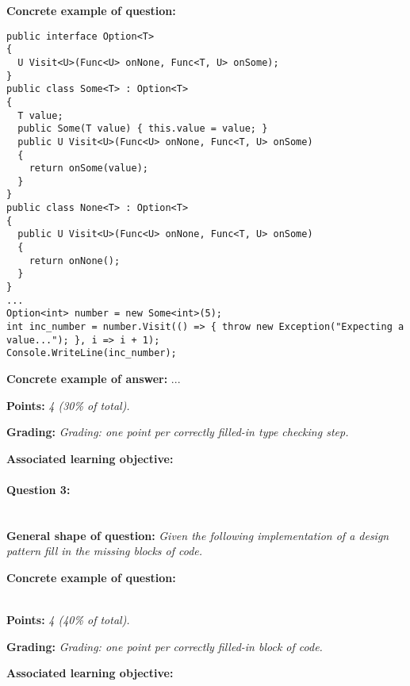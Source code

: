 \textbf{Concrete example of question:} 

\lstset{numbers=left,basicstyle=\ttfamily\small}\lstset{language=[Sharp]C}
\begin{lstlisting}
public interface Option<T>
{
  U Visit<U>(Func<U> onNone, Func<T, U> onSome);
}
public class Some<T> : Option<T>
{
  T value;
  public Some(T value) { this.value = value; }
  public U Visit<U>(Func<U> onNone, Func<T, U> onSome)
  {
    return onSome(value);
  }
}
public class None<T> : Option<T>
{
  public U Visit<U>(Func<U> onNone, Func<T, U> onSome)
  {
    return onNone();
  }
}
...
Option<int> number = new Some<int>(5);
int inc_number = number.Visit(() => { throw new Exception("Expecting a value..."); }, i => i + 1);
Console.WriteLine(inc_number);
\end{lstlisting}

\textbf{Concrete example of answer:} \textit{}
...

\textbf{Points:} \textit{4 (30\% of total).}

\textbf{Grading:} \textit{Grading: one point per correctly filled-in type checking step.}

\textbf{Associated learning objective:} 

\paragraph{Question 3: } \ \\

\textbf{General shape of question:} \textit{Given the following implementation of a design pattern fill in the missing blocks of code.}

\textbf{Concrete example of question:} 

\\
\textbf{Points:} \textit{4 (40\% of total).}

\textbf{Grading:} \textit{Grading: one point per correctly filled-in block of code.}

\textbf{Associated learning objective:} 

\ \\
